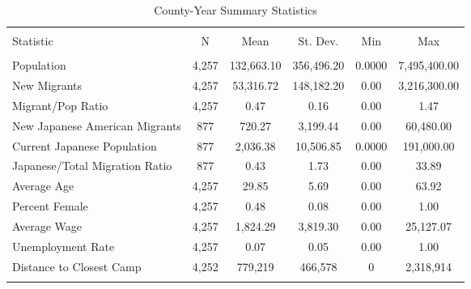 
\begin{table}[!htbp] \centering 
  \caption{County-Year Summary Statistics} 
  \label{ctysumstats} 
\begin{tabular}{@{\extracolsep{5pt}}lccccc} 
\\[-1.8ex]\hline 
\hline \\[-1.8ex] 
Statistic & \multicolumn{1}{c}{N} & \multicolumn{1}{c}{Mean} & \multicolumn{1}{c}{St. Dev.} & \multicolumn{1}{c}{Min} & \multicolumn{1}{c}{Max} \\ 
\hline \\[-1.8ex] 
Population & 4,257 & 132,663.10 & 356,496.20 & 0.0000 & 7,495,400.00 \\ 
New Migrants & 4,257 & 53,316.72 & 148,182.20 & 0.00 & 3,216,300.00 \\ 
Migrant/Pop Ratio & 4,257 & 0.47 & 0.16 & 0.00 & 1.47 \\ 
New Japanese American Migrants & 877 & 720.27 & 3,199.44 & 0.00 & 60,480.00 \\ 
Current Japanese Population & 877 & 2,036.38 & 10,506.85 & 0.0000 & 191,000.00 \\ 
Japanese/Total Migration Ratio & 877 & 0.43 & 1.73 & 0.00 & 33.89 \\ 
Average Age & 4,257 & 29.85 & 5.69 & 0.00 & 63.92 \\ 
Percent Female & 4,257 & 0.48 & 0.08 & 0.00 & 1.00 \\ 
Average Wage & 4,257 & 1,824.29 & 3,819.30 & 0.00 & 25,127.07 \\ 
Unemployment Rate & 4,257 & 0.07 & 0.05 & 0.00 & 1.00 \\ 
Distance to Closest Camp & 4,252 & 779,219 & 466,578 & 0 & 2,318,914\\ 
\hline \\[-1.8ex] 
\end{tabular} 
\end{table} 
